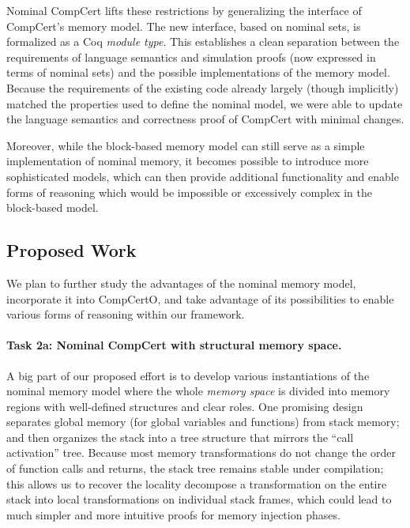 Nominal CompCert \cite{wang2022}
lifts these restrictions
by generalizing the interface of
CompCert's memory model.
The new interface,
based on nominal sets,
is formalized as a Coq \emph{module type}.
%
This establishes a clean separation between
the requirements of language semantics and simulation proofs
(now expressed in terms of nominal sets)
and the possible implementations of the memory model.
Because the requirements of the existing code
already largely (though implicitly) matched
the properties used to define the nominal model,
we were able to update
the language semantics and correctness proof of CompCert
with minimal changes.

Moreover,
while the block-based memory model
can still serve as a simple implementation of nominal memory,
it becomes possible to introduce
more sophisticated models,
which can then provide additional functionality
and enable forms of reasoning
which would be impossible
or excessively complex in the block-based model.

\subsection{Proposed Work}

We plan to
further study the advantages of the nominal memory model,
incorporate it into CompCertO,
and take advantage of its possibilities
to enable various forms of reasoning
within our framework.

\vspace*{-2ex}
\paragraph*{Task 2a: Nominal CompCert with structural memory space.}
A big part of our proposed effort is to develop various instantiations
of the nominal memory model where the whole {\em memory space} is
divided into memory regions with well-defined structures and clear
roles. One promising design~\cite{wang2022} separates global memory
(for global variables and functions) from stack memory; and then
organizes the stack into a tree structure that mirrors the ``call
activation'' tree.  Because most memory transformations do not change
the order of function calls and returns, the stack tree remains stable
under compilation; this allows us to recover the locality decompose a
transformation on the entire stack into local transformations on
individual stack frames, which could lead to much simpler and more
intuitive proofs for memory injection phases.

